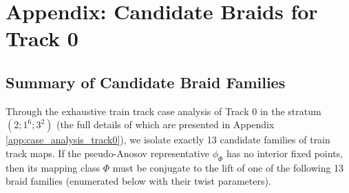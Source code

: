 \chapter[Appendix: Candidate Braids for Track 0]{Appendix: Candidate Braids for Track 0}
\label{app:candidate_braids_track_0}

\section{Summary of Candidate Braid Families}
\label{sec:summary_track0_braids}

Through the exhaustive train track case analysis of Track 0 in the stratum $(2;1^6;3^2)$ (the full details of which are presented in Appendix \ref{app:case_analysis_track0}), we isolate exactly 13 candidate families of train track maps. If the pseudo-Anosov representative $\phi_\Phi$ has no interior fixed points, then its mapping class $\Phi$ must be conjugate to the lift of one of the following 13 braid families (enumerated below with their twist parameters).


